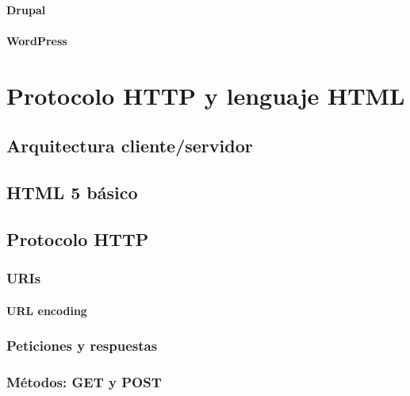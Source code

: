 \documentclass[a4paper,11pt,spanish]{sphinxmanual}
\begin{document}
\subsubsection{Drupal}
\label{\detokenize{introduccion:drupal}}

\subsubsection{WordPress}
\label{\detokenize{introduccion:wordpress}}

\chapter{Protocolo HTTP y lenguaje HTML}
\label{\detokenize{introduccion:protocolo-http-y-lenguaje-html}}

\section{Arquitectura cliente/servidor}
\label{\detokenize{introduccion:arquitectura-cliente-servidor}}

\section{HTML 5 básico}
\label{\detokenize{introduccion:html-5-basico}}

\section{Protocolo HTTP}
\label{\detokenize{introduccion:protocolo-http}}

\subsection{URIs}
\label{\detokenize{introduccion:uris}}

\subsubsection{URL encoding}
\label{\detokenize{introduccion:url-encoding}}

\subsection{Peticiones y respuestas}
\label{\detokenize{introduccion:peticiones-y-respuestas}}

\subsection{Métodos: GET y POST}
\label{\detokenize{introduccion:metodos-get-y-post}}
\end{document}
